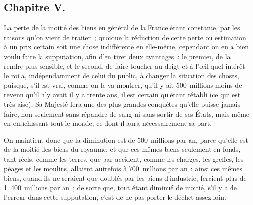 \documentclass[french,twoside]{book} %
\begin{document}
\subsection[{Chapitre V.}]{Chapitre V.}
\noindent La perte de la moitié des biens en général de la France étant constante, par les raisons qu’on vient de traiter ; quoique la réduction de cette perte ou estimation à un prix certain soit une chose indifférente en elle-même, cependant on en a bien voulu faire la supputation, afin d’en tirer deux avantages : le premier, de la rendre plus sensible, et le second, de faire toucher au doigt et à l’œil quel intérêt le roi a, indépendamment de celui du public, à changer la situation des choses, puisque, s’il est vrai, comme on le va montrer, qu’il y ait 500 millions moins de revenu qu’il n’y avait il y a trente ans, il est certain qu’étant rétabli (ce qui est très aisé), Sa Majesté fera une des plus grandes conquêtes qu’elle puisse jamais faire, non seulement sans répandre de sang ni sans sortir de ses États, mais même en enrichissant tout le monde, ce dont il aura nécessairement sa part.\par
On maintient donc que la diminution est de 500 millions par an, parce qu’elle est de la moitié des biens du royaume, et que ces mêmes biens seulement en fonds, tant réels, comme les terres, que par accident, comme les charges, les greffes, les péages et les moulins, allaient autrefois à 700 millions par an : ainsi ces mêmes biens, quand ils ne seraient que doublés par les biens d’industrie, feraient plus de 1 400 millions par an ; de sorte que, tout étant diminué de moitié, s’il y a de l’erreur dans cette supputation, c’est de ne pas porter le déchet assez loin.
\end{document}
